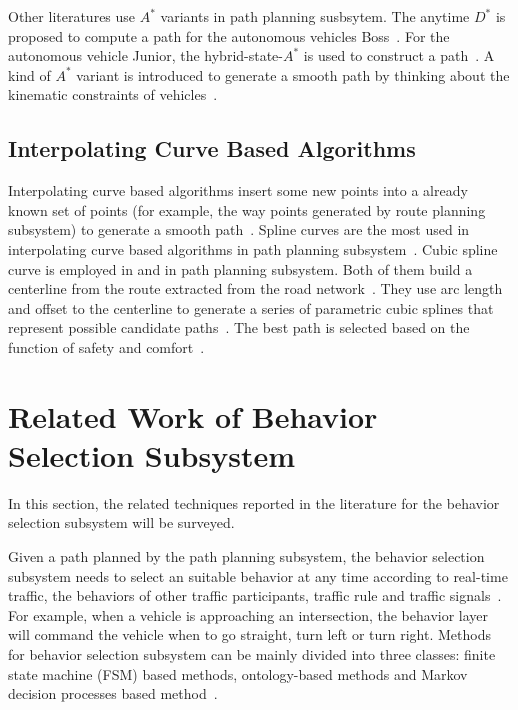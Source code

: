 \documentclass[conference]{IEEEtran}
\begin{document}
Other literatures use $A^*$ variants in path planning susbsytem. The anytime $D^*$ is proposed to compute a path for the autonomous vehicles Boss~\cite{Urmson2008}. For the autonomous vehicle Junior, the hybrid-state-$A^*$ is used to construct a path~\cite{Dmitri2010path}. A kind of $A^*$ variant is introduced to generate a smooth path by thinking about the kinematic constraints of vehicles~\cite{chu2015real}.

\subsection{Interpolating Curve Based Algorithms}
Interpolating curve based algorithms insert some new points into a already known set of points (for example, the way points generated by route planning subsystem) to generate a smooth path~\cite{self_driving}. Spline curves are the most used in interpolating curve based algorithms in path planning subsystem~\cite{self_driving}. Cubic spline curve is employed in \cite{chu2012local} and \cite{HU2018482} in path planning subsystem. Both of them build a centerline from the route extracted from the road network~\cite{chu2012local, HU2018482}. They use arc length and offset to the centerline to generate a series of parametric cubic splines that represent possible candidate paths~\cite{chu2012local, HU2018482}. The best path is selected based on the function of safety and comfort~\cite{chu2012local, HU2018482}.

\section{Related Work of Behavior Selection Subsystem}\label{sec:behavior_selector}
In this section, the related techniques reported in the literature for the behavior selection subsystem will be surveyed.

Given a path planned by the path planning subsystem, the behavior selection subsystem needs to select an suitable behavior at any time according to real-time traffic, the behaviors of other traffic participants, traffic rule and traffic signals~\cite{Brian2016}. For example, when a vehicle is approaching an intersection, the behavior layer will command the vehicle when to go straight, turn left or turn right. Methods for behavior selection subsystem can be mainly divided into three classes: finite state machine (FSM) based methods, ontology-based methods and Markov decision processes based method~\cite{self_driving}.
\end{document}
